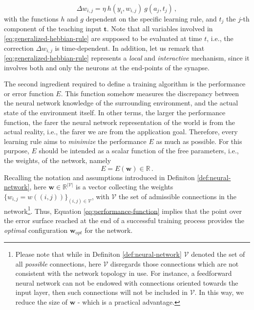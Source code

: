 \documentclass[12pt, a4paper, twoside, openright]{report}
\numberwithin{equation}{chapter}
\theoremstyle{theorem}
\theoremstyle{definition}
\theoremstyle{remark}
\theoremstyle{proposition}
\numberwithin{figure}{chapter}
\begin{document}
		\begin{equation}
			\label{eq:generalized-hebbian-rule}
			\Delta w_{i,j} = \eta ~ h(y_i,w_{i,j}) ~ g(a_j,t_j) \, ,
		\end{equation}
		with the functions $h$ and $g$ dependent on the specific learning rule, and $t_j$ the $j$-th component of the teaching input $\boldsymbol{t}$. Note that all variables involved in \eqref{eq:generalized-hebbian-rule} are supposed to be evaluated at time $t$, i.e., the correction $\Delta w_{i,j}$ is time-dependent. In addition, let us remark that \eqref{eq:generalized-hebbian-rule} represents a \emph{local} and \emph{interactive} mechanism, since it involves both and only the neurons at the end-points of the synapse.
		
		The second ingredient required to define a training algorithm is the performance or error function $E$. This function somehow measures the discrepancy between the neural network knowledge of the surrounding environment, and the actual state of the environment itself. In other terms, the larger the performance function, the farer the neural network representation of the world is from the actual reality, i.e., the farer we are from the application goal. Therefore, every learning rule aims to \emph{minimize} the performance $E$ as much as possible. For this purpose, $E$ should be intended as a scalar function of the free parameters, i.e., the weights, of the network, namely 
		\begin{equation}
			\label{eq:performance-function}
			E = E(\boldsymbol{w}) \in \mathbb{R} \, . 
		\end{equation}
		Recalling the notation and assumptions introduced in Definiton \ref{def:neural-network}, here $\boldsymbol{w} \in \mathbb{R}^{|\mathcal{V}|}$ is a vector collecting the weights $\big\lbrace w_{i,j} = w((i,j)) \big\rbrace_{(i,j) \in \mathcal{V}}$, with $\mathcal{V}$ the set of admissible connections in the network\footnote{Please note that while in Definiton \ref{def:neural-network} $\mathcal{V}$ denoted the set of all \emph{possible} connections, here $\mathcal{V}$ disregards those connections which are not consistent with the network topology in use. For instance, a feedforward neural network can not be endowed with connections oriented towards the input layer, then such connections will not be included in $\mathcal{V}$. In this way, we reduce the size of $\boldsymbol{w}$ - which is a practical advantage.}. Thus, Equation \eqref{eq:performance-function} implies that the point over the error surface reached at the end of a successful training process provides the \emph{optimal} configuration $\boldsymbol{w}_{opt}$ for the network.
		
\end{document}
